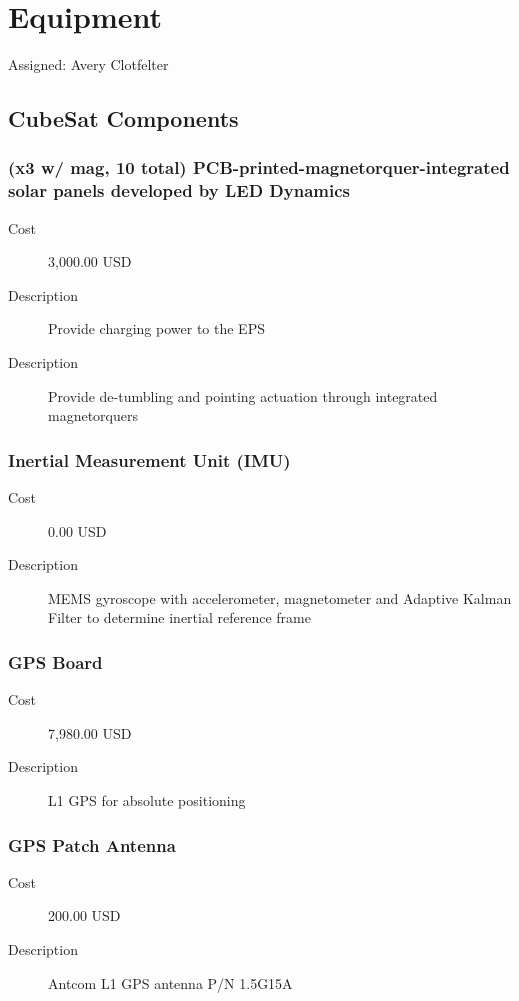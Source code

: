 \section{Equipment}
Assigned: Avery Clotfelter

\subsection{CubeSat Components}

\subsubsection{(x3 w/ mag, 10 total) PCB-printed-magnetorquer-integrated solar panels developed by LED Dynamics}
\begin{description}
\item[Cost] 3,000.00 USD
\item[Description] Provide charging power to the EPS
\item[Description] Provide de-tumbling and pointing actuation through integrated magnetorquers
\end{description}

\subsubsection{Inertial Measurement Unit (IMU)}
\begin{description}
\item[Cost] 0.00 USD
\item[Description] MEMS gyroscope with accelerometer, magnetometer and Adaptive Kalman Filter to determine inertial reference frame
\end{description}

\subsubsection{GPS Board}
\begin{description}
\item[Cost] 7,980.00 USD
\item[Description] L1 GPS for absolute positioning
\end{description}

\subsubsection{GPS Patch Antenna}
\begin{description}
\item[Cost] 200.00 USD
\item[Description] Antcom L1 GPS antenna P/N 1.5G15A
\end{description}

